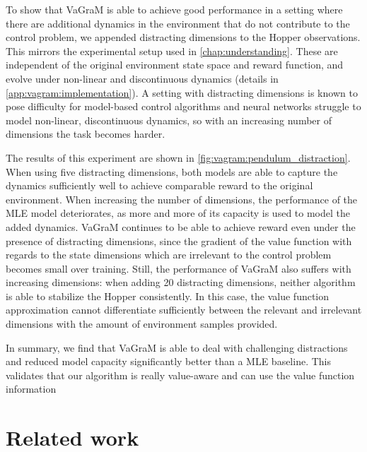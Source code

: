 To show that VaGraM is able to achieve good performance in a setting where there are additional dynamics in the environment that do not contribute to the control problem, we appended distracting dimensions to the Hopper observations.
This mirrors the experimental setup used in \autoref{chap:understanding}.
These are independent of the original environment state space and reward function, and evolve under non-linear and discontinuous dynamics (details in \autoref{app:vagram:implementation}).
A setting with distracting dimensions is known to pose difficulty for model-based control algorithms \parencite{stone2021thedc} and neural networks struggle to model non-linear, discontinuous dynamics, so with an increasing number of dimensions the task becomes harder.

The results of this experiment are shown in \autoref{fig:vagram:pendulum_distraction}.
When using five distracting dimensions, both models are able to capture the dynamics sufficiently well to achieve comparable reward to the original environment.
When increasing the number of dimensions, the performance of the MLE model deteriorates, as more and more of its capacity is used to model the added dynamics.
VaGraM continues to be able to achieve reward even under the presence of distracting dimensions, since the gradient of the value function with regards to the state dimensions which are irrelevant to the control problem becomes small over training.
Still, the performance of VaGraM also suffers with increasing dimensions: when adding 20 distracting dimensions, neither algorithm is able to stabilize the Hopper consistently.
In this case, the value function approximation cannot differentiate sufficiently between the relevant and irrelevant dimensions with the amount of environment samples provided.

In summary, we find that VaGraM is able to deal with challenging distractions and reduced model capacity significantly better than a MLE baseline. This validates that our algorithm is really value-aware and can use the value function information 

\section{Related work}

